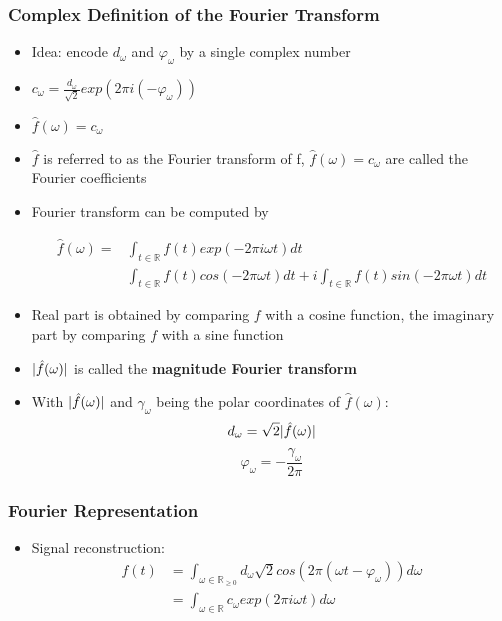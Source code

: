 \documentclass{scrartcl}
\DeclarePairedDelimiter\abs{\lvert}{\rvert}%
\newcommand{\ffrac}[2]{\ensuremath{\frac{\displaystyle #1}{\displaystyle #2}}}
\begin{document}
\subsubsection*{Complex Definition of the Fourier Transform}
\begin{itemize}
    \item
        Idea: encode $d_\omega$ and $\varphi_\omega$ by a single complex number
    \item
        $ c_\omega = \ffrac{d_\omega}{\sqrt{2}} exp(2\pi i(-\varphi_\omega))$
    \item
        $\hat{f}(\omega) = c_\omega$
    \item     
        $\hat{f}$ is referred to as the Fourier transform of f, $\hat{f}(\omega) = c_\omega$ are called the Fourier coefficients
    \item
        Fourier transform can be computed by

        \begin{align*}
            \hat{f}(\omega) = & \int_{t \in \mathbb{R}} f(t) exp(-2\pi i \omega t) dt\\
            & \int_{t \in \mathbb{R}} f(t) cos(-2\pi \omega t) dt + i \int_{t \in \mathbb{R}} f(t) sin(-2 \pi \omega t) dt
        \end{align*}
    \item
        Real part is obtained by comparing $f$ with a cosine function, the imaginary part by comparing $f$ with a sine function
    \item
        $\abs{\hat{f}(\omega)}$ is called the \textbf{magnitude Fourier transform}
    \item
        With $\abs{\hat{f}(\omega)}$ and $\gamma_\omega$ being the polar coordinates of $\hat{f}(\omega)$:
        $$d_\omega = \sqrt{2} \abs{\hat{f}(\omega)}$$
        $$\varphi_\omega = -\ffrac{\gamma_\omega}{2\pi}$$
\end{itemize}
\subsubsection*{Fourier Representation}
\begin{itemize}
    \item
        Signal reconstruction:
        \begin{align*}
            f(t) & = \int_{\omega \in \mathbb{R}_{\geq 0}} d_\omega \sqrt{2} cos(2 \pi (\omega t - \varphi_\omega))d\omega\\
            & = \int_{\omega \in \mathbb{R}} c_\omega exp(2\pi i \omega t)d \omega
        \end{align*}
        
\end{itemize}
\end{document}
